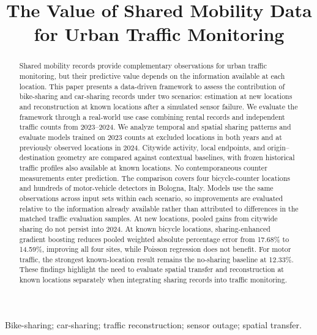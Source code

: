 \documentclass[]{interact}
\begin{document}
\title{The Value of Shared Mobility Data for Urban Traffic Monitoring}
\author{
}
\maketitle

\begin{abstract}
Shared mobility records provide complementary observations for urban traffic monitoring, but their predictive value depends on the information available at each location. This paper presents a data-driven framework to assess the contribution of bike-sharing and car-sharing records under two scenarios: estimation at new locations and reconstruction at known locations after a simulated sensor failure. We evaluate the framework through a real-world use case combining rental records and independent traffic counts from 2023--2024. We analyze temporal and spatial sharing patterns and evaluate models trained on 2023 counts at excluded locations in both years and at previously observed locations in 2024. Citywide activity, local endpoints, and origin--destination geometry are compared against contextual baselines, with frozen historical traffic profiles also available at known locations. No contemporaneous counter measurements enter prediction. The comparison covers four bicycle-counter locations and hundreds of motor-vehicle detectors in Bologna, Italy. Models use the same observations across input sets within each scenario, so improvements are evaluated relative to the information already available rather than attributed to differences in the matched traffic evaluation samples. At new locations, pooled gains from citywide sharing do not persist into 2024. At known bicycle locations, sharing-enhanced gradient boosting reduces pooled weighted absolute percentage error from 17.68\% to 14.59\%, improving all four sites, while Poisson regression does not benefit. For motor traffic, the strongest known-location result remains the no-sharing baseline at 12.33\%. These findings highlight the need to evaluate spatial transfer and reconstruction at known locations separately when integrating sharing records into traffic monitoring.
\end{abstract}
\begin{keywords}
Bike-sharing; car-sharing; traffic reconstruction; sensor outage; spatial transfer.
\end{keywords}
\end{document}
